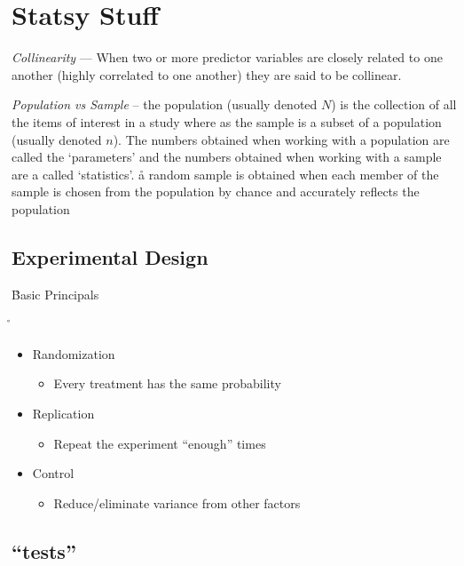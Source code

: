 \chapter{Statsy Stuff}


\emph{Collinearity} --- When two or more predictor variables are closely related to one another (highly correlated to one another) they are said to be collinear.

\emph{Population vs Sample} -- the population (usually denoted $N$) is the collection of all the items of interest in a study where as the sample is a subset of a population (usually denoted $n$). The numbers obtained when working with a population are called the `parameters' and the numbers obtained when working with a sample are a called `statistics'. \r{a random sample is obtained when each member of the sample is chosen from the population by chance and accurately reflects the population}




\section{Experimental Design}

\r{Basic Principals}

\r{
	\begin{itemize}[noitemsep,topsep=0pt]
		\item Randomization
		\begin{itemize}[noitemsep,topsep=0pt]
			\item Every treatment has the same probability
		\end{itemize}
		\item Replication
		\begin{itemize}[noitemsep,topsep=0pt]
			\item Repeat the experiment ``enough'' times
		\end{itemize}
		\item Control
		\begin{itemize}[noitemsep,topsep=0pt]
			\item Reduce/eliminate variance from other factors
		\end{itemize}
	\end{itemize}
}

\section{``tests''}

